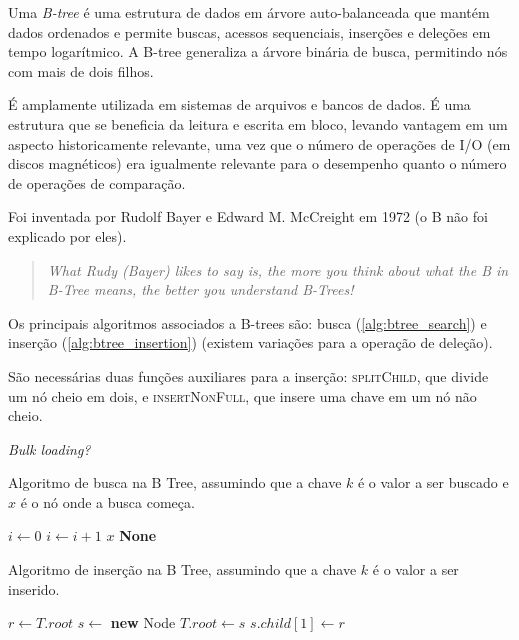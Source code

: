 Uma \textit{B-tree} é uma estrutura de dados em árvore auto-balanceada que mantém dados ordenados e permite buscas, acessos sequenciais, inserções e deleções em tempo logarítmico. A B-tree generaliza a árvore binária de busca, permitindo nós com mais de dois filhos.

É amplamente utilizada em sistemas de arquivos e bancos de dados. É uma estrutura que se beneficia da leitura e escrita em bloco, levando vantagem em um aspecto historicamente relevante, uma vez que o número de operações de I/O (em discos magnéticos) era igualmente relevante para o desempenho quanto o número de operações de comparação.

Foi inventada por Rudolf Bayer e Edward M. McCreight em 1972 \cite{btree:bayer1970} (o B não foi explicado por eles).

\begin{quotation}
    \it What Rudy (Bayer) likes to say is, the more you think about what the B in B-Tree means, the better you understand B-Trees!
\end{quotation}

Os principais algoritmos associados a B-trees são: busca (\cref{alg:btree_search}) e inserção (\cref{alg:btree_insertion}) (existem variações para a operação de deleção).

São necessárias duas funções auxiliares para a inserção: \textsc{splitChild}, que divide um nó cheio em dois, e \textsc{insertNonFull}, que insere uma chave em um nó não cheio.

\textit{Bulk loading?}

\begin{algorithm}
\caption{Algoritmo de busca na B Tree, assumindo que a chave $k$ é o valor a ser buscado e $x$ é o nó onde a busca começa.}
\label{alg:btree_search}
\begin{algorithmic}[1]
    \State $i \gets 0$
        \State $i \gets i + 1$
    \EndWhile
        \State \Return $x$
    \EndIf
        \State \Return \textbf{None}
    \EndIf
    \State \Return {}
\EndProcedure
\end{algorithmic}
\end{algorithm}

\begin{algorithm}
\caption{Algoritmo de inserção na B Tree, assumindo que a chave $k$ é o valor a ser inserido.}
\label{alg:btree_insertion}
\begin{algorithmic}[1]
    \State $r \gets T.root$
        \State $s \gets$ \textbf{new} Node
        \State $T.root \gets s$
        \State $s.child[1] \gets r$
        \State {}
        \State {}
    \Else
        \State {}
    \EndIf
\EndProcedure
\end{algorithmic}
\end{algorithm}

